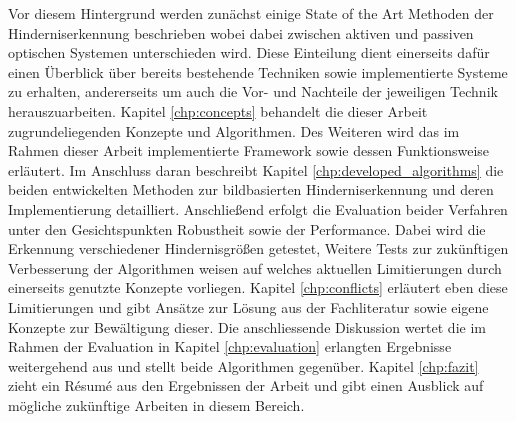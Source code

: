 \noindent
Vor diesem Hintergrund werden zunächst einige State of the Art Methoden der Hinderniserkennung beschrieben wobei dabei zwischen aktiven und passiven optischen Systemen unterschieden wird. Diese Einteilung dient einerseits dafür einen Überblick über bereits bestehende Techniken sowie implementierte Systeme zu erhalten, andererseits um auch die Vor- und Nachteile der jeweiligen Technik herauszuarbeiten. Kapitel \ref{chp:concepts} behandelt die dieser Arbeit zugrundeliegenden Konzepte und Algorithmen. Des Weiteren wird das im Rahmen dieser Arbeit implementierte Framework sowie dessen Funktionsweise erläutert. Im Anschluss daran beschreibt Kapitel \ref{chp:developed_algorithms} die beiden entwickelten Methoden zur bildbasierten Hinderniserkennung und deren Implementierung detailliert. Anschließend erfolgt die Evaluation beider Verfahren unter den Gesichtspunkten Robustheit sowie der Performance. Dabei wird die Erkennung verschiedener Hindernisgrößen getestet, 
Weitere Tests zur zukünftigen Verbesserung der Algorithmen weisen auf welches aktuellen Limitierungen durch einerseits genutzte Konzepte vorliegen. Kapitel \ref{chp:conflicts} erläutert eben diese Limitierungen und gibt Ansätze zur Lösung aus der Fachliteratur sowie eigene Konzepte zur Bewältigung dieser. Die anschliessende Diskussion wertet die im Rahmen der Evaluation in Kapitel \ref{chp:evaluation} erlangten Ergebnisse weitergehend aus und stellt beide Algorithmen gegenüber. Kapitel \ref{chp:fazit} zieht ein Ré­su­mé aus den Ergebnissen der Arbeit und gibt einen Ausblick auf mögliche zukünftige Arbeiten in diesem Bereich.